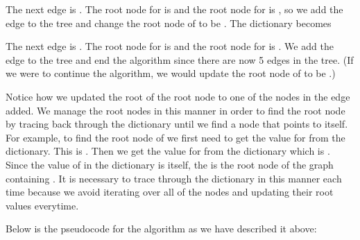 The next edge is .
The root node for  is  and the root node for  is , so we add the edge to the tree and change the root node of  to be .
The dictionary becomes 

The next edge is .
The root node for  is  and the root node for  is .
We add the edge to the tree and end the algorithm since there are now 5 edges in the tree.
(If we were to continue the algorithm, we would update the root node of  to be .)

Notice how we updated the root of the root node to one of the nodes in the edge added.
We manage the root nodes in this manner in order to find the root node by tracing back through the dictionary until we find a node that points to itself.
For example, to find the root node of  we first need to get the value for  from the dictionary.  This is .
Then we get the value for  from the dictionary which is .
Since the value of  in the dictionary is itself, the  is the root node of the graph containing .
It is necessary to trace through the dictionary in this manner each time because we avoid iterating over all of the nodes and updating their root values everytime.

Below is the pseudocode for the algorithm as we have described it above:

